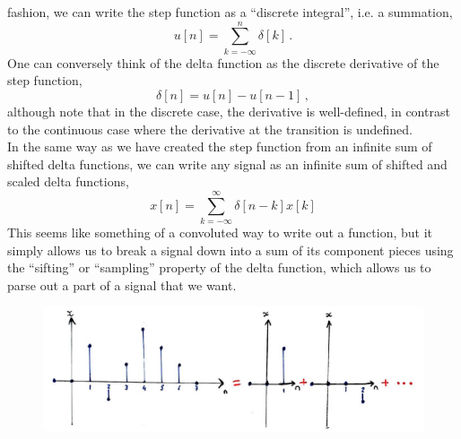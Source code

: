 fashion, we can write the step function as a ``discrete integral'', i.e. a summation,
%
\begin{equation}
  u[n] = \sum_{k=-\infty}^n \delta[k] \,.
\end{equation}
%
One can conversely think of the delta function as the discrete derivative of the step function,
%
\begin{equation}
  \delta[n] = u[n] - u[n-1] \,,
\end{equation}
%
although note that in the discrete case, the derivative is well-defined, in contrast to the continuous
case where the derivative at the transition is undefined.\\
%
In the same way as we have created the step function from an infinite sum of shifted delta functions,
we can write any signal as an infinite sum of shifted and scaled delta functions,
%
\begin{equation}
  x[n] = \sum_{k=-\infty}^\infty \delta[n-k] x[k]
\end{equation}
%
This seems like something of a convoluted way to write out a function, but it simply allows us to
break a signal down into a sum of its component pieces using the ``sifting'' or ``sampling'' property
of the delta function, which allows us to parse out a part of a signal that we want.
%
\begin{figure}[!htb]
  \includegraphics[width=\textwidth]{images/lecture_1_sum_of_deltas.JPG}
  \caption{
  }
  \label{fig::lecture_1_sum_of_deltas}
\end{figure}

